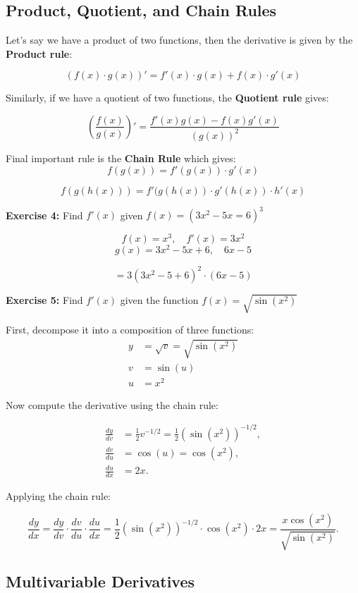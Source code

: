 \subsection{Product, Quotient, and Chain Rules}

Let's say we have a product of two functions, then the derivative is given by the \textbf{Product rule}:

\[
(f(x) \cdot g(x))' = f'(x) \cdot g(x) + f(x) \cdot g'(x)
\]

Similarly, if we have a quotient of two functions, the \textbf{Quotient rule} gives:

\[
\left( \frac{f(x)}{g(x)} \right)' = \frac{f'(x)g(x) - f(x)g'(x)}{(g(x))^2}
\]

Final important rule is the \textbf{Chain Rule} which gives:
\[
f(g(x)) = f'(g(x)) \cdot g'(x)
\]

\[f(g(h(x)))=f'(g(h(x)) \cdot g'(h(x)) \cdot h'(x)\]

\textbf{Exercise 4:} Find \( f'(x) \) given \(f(x) = (3x^2 - 5x = 6)^3\)

\[ f(x) = x^3, \quad f'(x) = 3x^2\]
\[ g(x) = 3x^2 -5x +6, \quad 6x - 5\]

\[= 3(3x^2 -5 + 6)^2 \cdot (6x - 5)\]

\textbf{Exercise 5:} Find \( f'(x) \) given the function \( f(x) = \sqrt{\sin(x^2)} \)

\bigskip

First, decompose it into a composition of three functions:
\begin{align*}
y &= \sqrt{v} = \sqrt{\sin(x^2)} \\
v &= \sin(u) \\
u &= x^2
\end{align*}

Now compute the derivative using the chain rule:

\begin{align*}
\frac{dy}{dv} &= \frac{1}{2} v^{-1/2} = \frac{1}{2} \left( \sin(x^2) \right)^{-1/2}, \\
\frac{dv}{du} &= \cos(u) = \cos(x^2), \\
\frac{du}{dx} &= 2x.
\end{align*}

Applying the chain rule:

\[
\frac{dy}{dx} = \frac{dy}{dv} \cdot \frac{dv}{du} \cdot \frac{du}{dx}
= \frac{1}{2} \left( \sin(x^2) \right)^{-1/2} \cdot \cos(x^2) \cdot 2x
= \frac{x \cos(x^2)}{\sqrt{\sin(x^2)}}.
\]

\subsection{Multivariable Derivatives}


